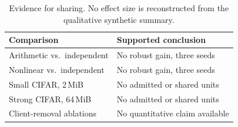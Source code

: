 \begin{table}[t]
\caption{Evidence for sharing. No effect size is reconstructed from the qualitative synthetic summary.}
\label{tab:reuse}\centering\small
\begin{tabularx}{\linewidth}{YY}\toprule
Comparison & Supported conclusion\\\midrule
Arithmetic vs.\ independent & No robust gain, three seeds\\
Nonlinear vs.\ independent & No robust gain, three seeds\\
Small CIFAR, 2\,MiB & No admitted or shared units\\
Strong CIFAR, 64\,MiB & No admitted or shared units\\
Client-removal ablations & No quantitative claim available\\
\bottomrule\end{tabularx}\end{table}

